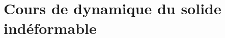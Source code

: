 \setchapterpreamble[u]{\margintoc}

\chapter{Cours de dynamique du solide indéformable}

%


%
%
%
%
%
%
%
%
%
%
%
%
%
%
%
%
